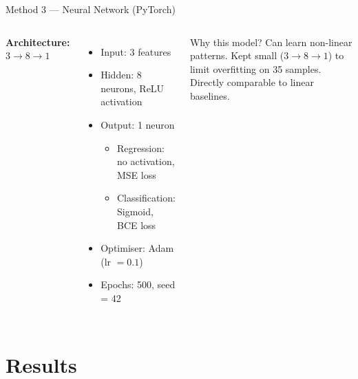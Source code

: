 \documentclass[aspectratio=169]{beamer}
\begin{document}
\begin{frame}{Method 3 --- Neural Network (PyTorch)}
  \begin{columns}
      \textbf{Architecture:} \quad $3 \rightarrow 8 \rightarrow 1$
      \begin{itemize}
        \item Input: 3 features
        \item Hidden: 8 neurons, ReLU activation
        \item Output: 1 neuron
          \begin{itemize}
            \item Regression: no activation, MSE loss
            \item Classification: Sigmoid, BCE loss
          \end{itemize}
        \item Optimiser: Adam (lr $= 0.1$)
        \item Epochs: 500, seed = 42
      \end{itemize}
      \begin{block}{Why this model?}
        Can learn non-linear patterns. Kept small ($3{\to}8{\to}1$) to limit overfitting on 35 samples. Directly comparable to linear baselines.
      \end{block}
  \end{columns}
\end{frame}

\section{Results}
\end{document}
